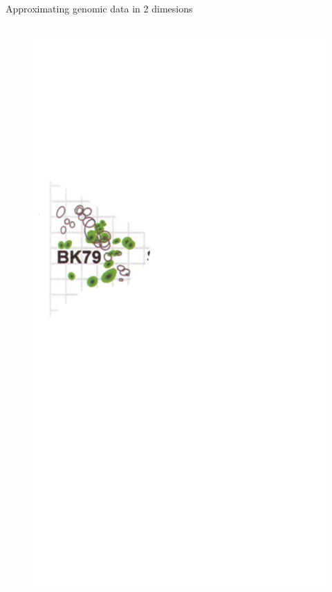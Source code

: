 \documentclass{beamer}
\begin{document}
\begin{frame}{Approximating genomic data in 2 dimesions }

    \begin{columns}
        \begin{column}{0.6\textwidth}
        \begin{figure}
        \includegraphics[width=\textwidth]{influenza_map/smith_antigenic_1.png}    

\end{figure}
\end{column}
\end{columns}
\end{frame}
\end{document}
